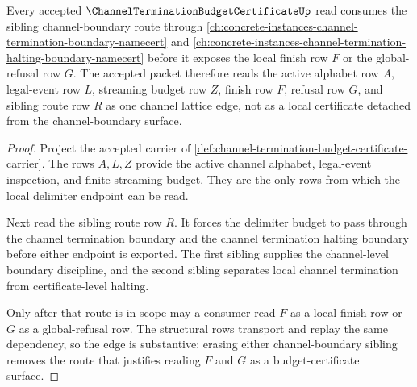 \begin{theorem}
\label{thm:channel-termination-budget-certificate-channel-sibling-route}
Every accepted $\ChannelTerminationBudgetCertificateUp$ read consumes the sibling channel-boundary route through \autoref{ch:concrete-instances-channel-termination-boundary-namecert} and \autoref{ch:concrete-instances-channel-termination-halting-boundary-namecert} before it exposes the local finish row $F$ or the global-refusal row $G$. The accepted packet therefore reads the active alphabet row $A$, legal-event row $L$, streaming budget row $Z$, finish row $F$, refusal row $G$, and sibling route row $R$ as one channel lattice edge, not as a local certificate detached from the channel-boundary surface.
\end{theorem}
\begin{proof}
Project the accepted carrier of \autoref{def:channel-termination-budget-certificate-carrier}. The rows $A,L,Z$ provide the active channel alphabet, legal-event inspection, and finite streaming budget. They are the only rows from which the local delimiter endpoint can be read.

Next read the sibling route row $R$. It forces the delimiter budget to pass through the channel termination boundary and the channel termination halting boundary before either endpoint is exported. The first sibling supplies the channel-level boundary discipline, and the second sibling separates local channel termination from certificate-level halting.

Only after that route is in scope may a consumer read $F$ as a local finish row or $G$ as a global-refusal row. The structural rows transport and replay the same dependency, so the edge is substantive: erasing either channel-boundary sibling removes the route that justifies reading $F$ and $G$ as a budget-certificate surface.
\end{proof}

